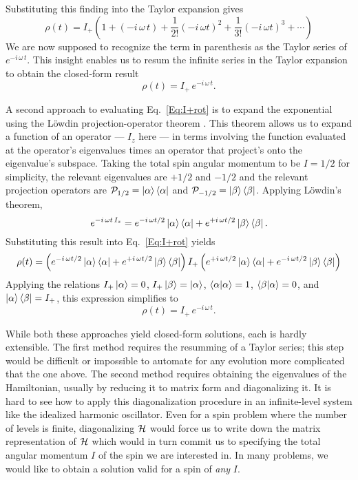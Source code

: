 Substituting this finding into the Taylor expansion gives
\begin{equation}
\rho(t) 
	= I_{+} \left( 1 
		+ (-i \, \omega \, t) 
		+ \frac{1}{2!} (-i \, \omega t)^2 
		+ \frac{1}{3!} (-i \, \omega t)^3
		+ \cdots
	\right)
\end{equation}
We are now supposed to recognize the term in parenthesis as the Taylor series of $e^{-i \, \omega \, t}$.  This insight enables us to resum the infinite series in the Taylor expansion to obtain the closed-form result
\begin{equation}
\rho(t) 
	= I_{+} \, e^{-i \, \omega \, t}.
	\label{Eq:I+-soln-method-1}
\end{equation}   

 A second approach to evaluating Eq.~\ref{Eq:I+rot} is to expand the exponential using the L\"{o}wdin projection-operator theorem \cite{Lowdin1955mar}.  This theorem allows us to expand a function of an operator --- $I_z$ here --- in terms involving the function evaluated at the operator's eigenvalues times an operator that project's onto the eigenvalue's subspace.  Taking the total spin angular momentum to be $I = 1/2$ for simplicity, the relevant eigenvalues are $+1/2$ and $-1/2$ and the relevant projection operators are ${\cal P}_{1/2} = \ket{\alpha}\bra{\alpha}$ and ${\cal P}_{-1/2} = \ket{\beta}\bra{\beta}$.  Applying L\"{o}wdin's theorem,
\begin{equation}
e^{-i \, \omega t \, I_z} 
	= e^{-i \, \omega t / 2} \ket{\alpha}\bra{\alpha}
	+ e^{+i \, \omega t / 2} \ket{\beta}\bra{\beta}.
\end{equation}
Substituting this result into Eq.~\ref{Eq:I+rot} yields
\[
\rho(t) = \left( e^{-i \, \omega t / 2} \ket{\alpha}\bra{\alpha}
	+ e^{+i \, \omega t / 2} \ket{\beta}\bra{\beta} \right)
	I_{+} \left( e^{+i \, \omega t / 2} \ket{\alpha}\bra{\alpha}
	+ e^{-i \, \omega t / 2} \ket{\beta}\bra{\beta} \right)
\]
Applying the relations $I_{+} \ket{\alpha} = 0$, $I_{+} \ket{\beta} = \ket{\alpha}$, $\braket{\alpha|\alpha} = 1$, $\braket{\beta|\alpha} = 0$, and $\ket{\alpha} \bra{\beta} = I_{+}$, this expression simplifies to
\begin{equation}
\rho(t) 
	= I_{+} \, e^{-i \, \omega \, t}.
	\label{Eq:I+-soln-method-2}
\end{equation} 

While both these approaches yield closed-form solutions, each is hardly extensible.  The first method requires the resumming of a Taylor series; this step would be difficult or impossible to automate for any evolution more complicated that the one above.  The second method requires obtaining the eigenvalues of the Hamiltonian, usually by reducing it to matrix form and diagonalizing it.  It is hard to see how to apply this diagonalization procedure in an infinite-level system like the idealized harmonic oscillator. Even for a spin problem where the number of levels is finite, diagonalizing ${\cal H}$ would force us to write down the matrix representation of ${\cal H}$ which would in turn commit us to specifying the total angular momentum $I$ of the spin we are interested in.  In many problems, we would like to obtain a solution valid for a spin of \emph{any} $I$.  

